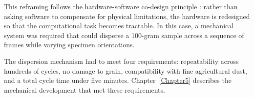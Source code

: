 This reframing follows the hardware-software co-design principle \cite{Keutzer2000}: rather than asking software to compensate for physical limitations, the hardware is redesigned so that the computational task becomes tractable. In this case, a mechanical system was required that could disperse a 100-gram sample across a sequence of frames while varying specimen orientations.

The dispersion mechanism had to meet four requirements: repeatability across hundreds of cycles, no damage to grain, compatibility with fine agricultural dust, and a total cycle time under five minutes. Chapter~\ref{Chapter5} describes the mechanical development that met these requirements.

